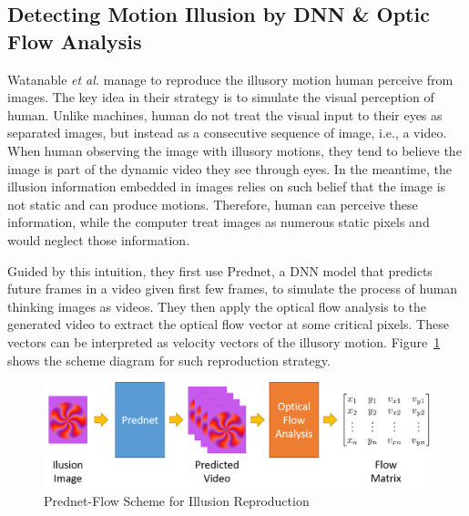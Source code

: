 \documentclass[journal]{IEEEtran}
\begin{document}
\subsection{Detecting Motion Illusion by DNN \& Optic Flow Analysis}
\label{sec:detection_dnn}
Watanable \textit{et al.} \cite{watanable2018illusory} manage to reproduce the illusory motion human perceive from images.
The key idea in their strategy is to simulate the visual perception of human.
Unlike machines, human do not treat the visual input to their eyes as separated images, but instead as a consecutive sequence of image, i.e., a video.
When human observing the image with illusory motions, they tend to believe the image is part of the dynamic video they see through eyes.
In the meantime, the illusion information embedded in images relies on such belief that the image is not static and can produce motions.
Therefore, human can perceive these information, while the computer treat images as numerous static pixels and would neglect those information.

Guided by this intuition, they first use Prednet, a DNN model that predicts future frames in a video given first few frames, to simulate the process of human thinking images as videos.
They then apply the optical flow analysis to the generated video to extract the optical flow vector at some critical pixels.
These vectors can be interpreted as velocity vectors of the illusory motion.
Figure~\ref{fig:scheme} shows the scheme diagram for such reproduction strategy.

\begin{figure}[t]
  \centering
  \includegraphics[width=\linewidth]{fig/pred-flow-procedure.png}
  \caption{Prednet-Flow Scheme for Illusion Reproduction}
  \label{fig:scheme}
\end{figure}

\end{document}
